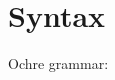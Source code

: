 \documentclass[12pt,twoside]{report}
\begin{document}









\section{Syntax}
Ochre grammar:
\end{document}
